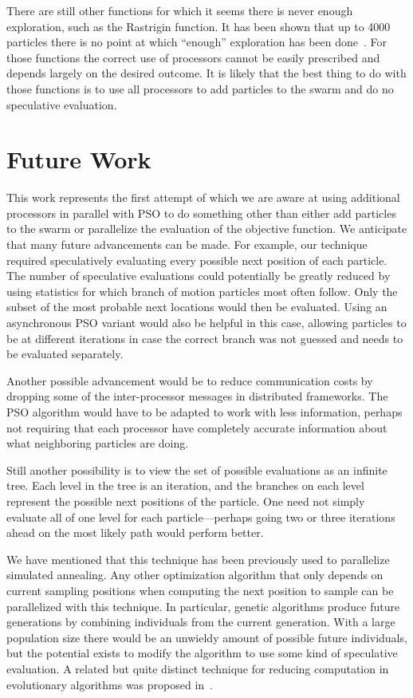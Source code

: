 \documentclass[conference,letterpaper]{IEEEtran}
\begin{document}
There are still other functions for which it seems there is never enough
exploration, such as the Rastrigin function.  It has been shown that up to 4000
particles there is no point at which ``enough'' exploration has been
done~\cite{mcnabb-cec09}.  For those functions the correct use of processors
cannot be easily prescribed and depends largely on the desired outcome.  It is
likely that the best thing to do with those functions is to use all processors
to add particles to the swarm and do no speculative evaluation.

\section{Future Work}
\label{sec:future}

This work represents the first attempt of which we are aware at using
additional processors in parallel with PSO to do something other than either
add particles to the swarm or parallelize the evaluation of the objective
function.  We anticipate that many future advancements can be made.  For
example, our technique required speculatively evaluating every possible next
position of each particle.  The number of speculative evaluations could
potentially be greatly reduced by using statistics for which branch of motion
particles most often follow.  Only the subset of the most probable next
locations would then be evaluated.  Using an asynchronous PSO variant would
also be helpful in this case, allowing particles to be at different iterations
in case the correct branch was not guessed and needs to be evaluated
separately.

Another possible advancement would be to reduce communication costs by dropping
some of the inter-processor messages in distributed frameworks.  The PSO
algorithm would have to be adapted to work with less information, perhaps not
requiring that each processor have completely accurate information about what
neighboring particles are doing.

Still another possibility is to view the set of possible evaluations as an
infinite tree.  Each level in the tree is an iteration, and the branches on
each level represent the possible next positions of the particle.  One need not
simply evaluate all of one level for each particle---perhaps going two or three
iterations ahead on the most likely path would perform better.

We have mentioned that this technique has been previously used to parallelize
simulated annealing.  Any other optimization algorithm that only depends on 
current sampling positions when computing the next position to sample can be
parallelized with this technique.  In particular, genetic algorithms produce
future generations by combining individuals from the current generation.  With
a large population size there would be an unwieldy amount of possible future
individuals, but the potential exists to modify the algorithm to use some kind
of speculative evaluation.  A related but quite distinct technique for reducing
computation in evolutionary algorithms was proposed in~\cite{poli-ai06}.
\end{document}
